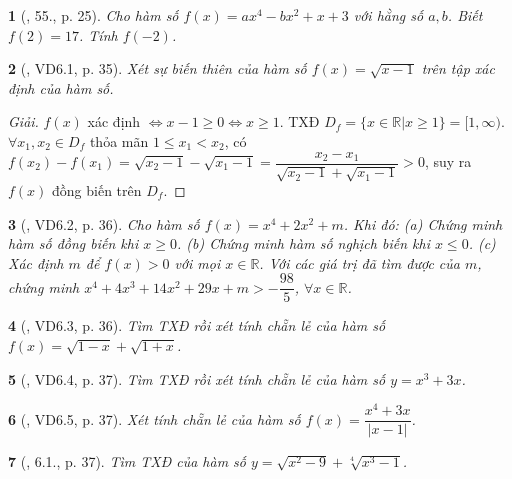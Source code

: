 \documentclass{article}
\newtheorem{baitoan}{}
\begin{document}
\begin{baitoan}[\cite{Binh_Toan_9_tap_1}, 55., p. 25]
	Cho hàm số $f(x) = ax^4 - bx^2 + x + 3$ với hằng số $a,b$. Biết $f(2) = 17$. Tính $f(-2)$.
\end{baitoan}

\begin{baitoan}[\cite{TLCT_THCS_Toan_9_dai_so}, VD6.1, p. 35]
	Xét sự biến thiên của hàm số $f(x) = \sqrt{x - 1}$ trên tập xác định của hàm số.
\end{baitoan}

\begin{proof}[Giải]
	$f(x)$ xác định $\Leftrightarrow x - 1\ge0\Leftrightarrow x\ge1$. TXĐ $D_f = \{x\in\mathbb{R}|x\ge1\} = [1,\infty)$. $\forall x_1,x_2\in D_f$ thỏa mãn $1\le x_1 < x_2$, có $f(x_2) - f(x_1) = \sqrt{x_2 - 1} - \sqrt{x_1 - 1} = \dfrac{x_2 - x_1}{\sqrt{x_2 - 1} + \sqrt{x_1 - 1}} > 0$, suy ra $f(x)$ đồng biến trên $D_f$.
\end{proof}

\begin{baitoan}[\cite{TLCT_THCS_Toan_9_dai_so}, VD6.2, p. 36]
	Cho hàm số $f(x) = x^4 + 2x^2 + m$. Khi đó: (a) Chứng minh hàm số đồng biến khi $x\ge0$. (b) Chứng minh hàm số nghịch biến khi $x\le0$. (c) Xác định $m$ để $f(x) > 0$ với mọi $x\in\mathbb{R}$. Với các giá trị đã tìm được của $m$, chứng minh $x^4 + 4x^3 + 14x^2 + 29x + m > -\dfrac{98}{5}$, $\forall x\in\mathbb{R}$.
\end{baitoan}

\begin{baitoan}[\cite{TLCT_THCS_Toan_9_dai_so}, VD6.3, p. 36]
	Tìm {\rm TXĐ} rồi xét tính chẵn lẻ của hàm số $f(x) = \sqrt{1 - x} + \sqrt{1 + x}$.
\end{baitoan}

\begin{baitoan}[\cite{TLCT_THCS_Toan_9_dai_so}, VD6.4, p. 37]
	Tìm {\rm TXĐ} rồi xét tính chẵn lẻ của hàm số $y = x^3 + 3x$.
\end{baitoan}

\begin{baitoan}[\cite{TLCT_THCS_Toan_9_dai_so}, VD6.5, p. 37]
	Xét tính chẵn lẻ của hàm số $f(x) = \dfrac{x^4 + 3x}{|x - 1|}$.
\end{baitoan}

\begin{baitoan}[\cite{TLCT_THCS_Toan_9_dai_so}, 6.1., p. 37]
	Tìm {\rm TXĐ} của hàm số $y = \sqrt{x^2 - 9} + \sqrt[4]{x^3 - 1}$.
\end{baitoan}
\end{document}
